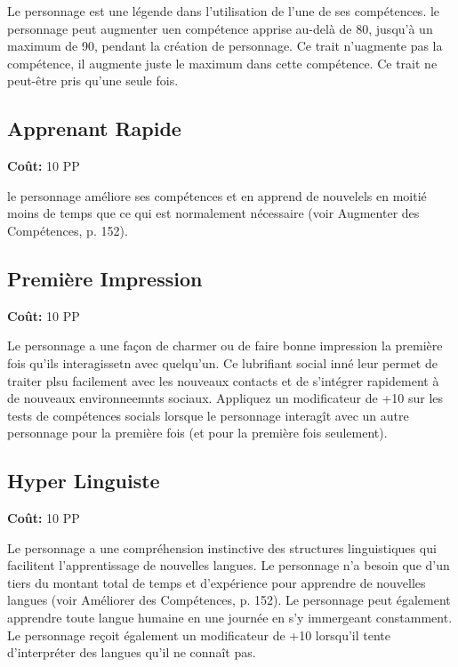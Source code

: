 Le personnage est une légende dans l'utilisation de l'une de ses compétences. le personnage peut augmenter uen compétence apprise au-delà de 80, jusqu'à un maximum de 90, pendant la création de personnage. Ce trait n'uagmente pas la compétence, il augmente juste le maximum dans cette compétence. Ce trait ne peut-être pris qu'une seule fois. 

\subsection{Apprenant Rapide} \label{sec:traits-fast-learnier} 

\textbf{Coût:} 10 PP 

le personnage améliore ses compétences et en apprend de nouvelels en moitié moins de temps que ce qui est normalement nécessaire (voir Augmenter des Compétences, p. 152). 

\subsection{Première Impression} \label{sec:traits-first-impression} 

\textbf{Coût:} 10 PP 

Le personnage a une façon de charmer ou de faire bonne impression la première fois qu'ils interagissetn avec quelqu'un. Ce lubrifiant social inné leur permet de traiter plsu facilement avec les nouveaux contacts et de s'intégrer rapidement à de nouveaux environneemnts sociaux. Appliquez un modificateur de +10 sur les tests de compétences socials lorsque le personnage interagît avec un autre personnage pour la première fois (et pour la première fois seulement). 

\subsection{Hyper Linguiste} \label{sec:traits-hyper-linguist} 

\textbf{Coût:} 10 PP 

Le personnage a une compréhension instinctive des structures linguistiques qui facilitent l'apprentissage de nouvelles langues. Le personnage n'a besoin que d'un tiers du montant total de temps et d'expérience pour apprendre de nouvelles langues (voir Améliorer des Compétences, p. 152). Le personnage peut également apprendre toute langue humaine en une journée en s'y immergeant constamment. Le personnage reçoit également un modificateur de +10 lorsqu'il tente d'interpréter des langues qu'il ne connaît pas. 

